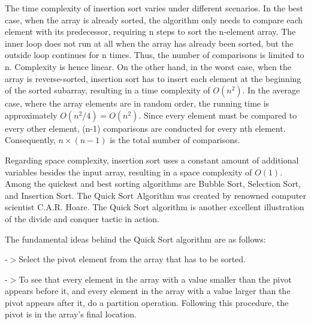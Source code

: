 \documentclass[twocolumn]{article}
\begin{document}

The time complexity of insertion sort varies under different scenarios. In the best case, when the array is already sorted, the algorithm only needs to compare each element with its predecessor, requiring n steps to sort the n-element array. The inner loop does not run at all when the array has already been sorted, but the outside loop continues for n times. Thus, the number of comparisons is limited to n. Complexity is hence linear. On the other hand, in the worst case, when the array is reverse-sorted, insertion sort has to insert each element at the beginning of the sorted subarray, resulting in a time complexity of $O(n^2)$. In the average case, where the array elements are in random order, the running time is approximately $O(n^2 / 4) = O(n^2)$. Since every element must be compared to every other element, (n-1) comparisons are conducted for every nth element. Consequently, $n \times (n-1)$ is the total number of comparisons.

\vspace{20pt}
Regarding space complexity, insertion sort uses a constant amount of additional variables besides the input array, resulting in a space complexity of $O(1)$.\vspace{20pt}
\vspace{5pt}
Among the quickest and best sorting algorithms are Bubble Sort, Selection Sort, and Insertion Sort. The Quick Sort Algorithm was created by renowned computer scientist C.A.R. Hoare. The Quick Sort algorithm is another excellent illustration of the divide and conquer tactic in action.\cite{5}\vspace{30pt}

The fundamental ideas behind the Quick Sort algorithm are as follows:\vspace{20pt}

    -$>$Select the pivot element from the array that has to be sorted.\vspace{10pt}

    -$>$To see that every element in the array with a value smaller than the pivot appears before it, and every element in the array with a value larger than the pivot appears after it, do a partition operation. Following this procedure, the pivot is in the array's final location.\vspace{10pt}
\end{document}
